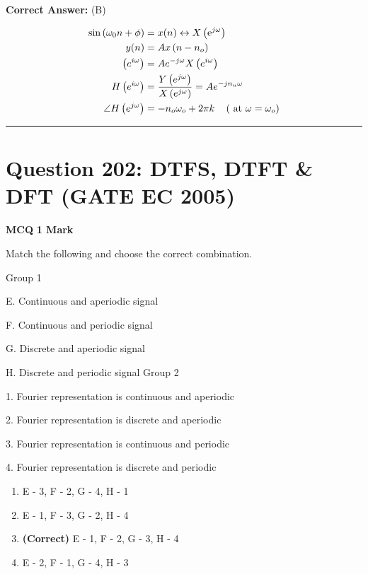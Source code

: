 \documentclass[11pt,a4paper]{article}
\begin{document}
\noindent \textbf{Correct Answer:} (B)

\begin{tcolorbox}[solbox, title=Detailed Solution -- Question 201]
\[
\begin{aligned} \sin \left(\omega_{0} n+\phi\right) &=x(n) \leftrightarrow X\left(\mathrm{e}^{j \omega}\right) \\ y(n) &=A x\left(n-n_{o}\right) \\ \left(e^{i \omega}\right) &=A e^{-j \omega} X\left(e^{i \omega}\right) \\ H\left(e^{i \omega}\right) &=\frac{Y\left(e^{j \omega}\right)}{X\left(e^{j\omega}\right)}=A e^{-j n_{u} \omega}\\ \angle H\left(e^{j \omega}\right)&=-n_{o} \omega_{o}+2 \pi k \quad\left(\text { at } \omega=\omega_{o}\right) \end{aligned}\\
\]
\end{tcolorbox}

\vspace{1.5em}
\hrule
\vspace{1.5em}

\section*{Question 202: DTFS, DTFT \& DFT (GATE EC 2005)}
\noindent \textbf{\color{primary}MCQ} \hfill \textbf{\color{secondary}1 Mark}


\noindent Match the following and choose the correct combination. 

Group 1 

E. Continuous and aperiodic signal 

F. Continuous and periodic signal 

G. Discrete and aperiodic signal 

H. Discrete and periodic signal             
                                                                                                          Group 2 

1. Fourier representation is continuous and aperiodic 

2. Fourier representation is discrete and aperiodic 

3. Fourier representation is continuous and periodic 

4. Fourier representation is discrete and periodic


\begin{enumerate}[label=(\Alph*)]
    \item E - 3, F - 2, G - 4, H - 1
    \item E - 1, F - 3, G - 2, H - 4
    \item \textbf{(Correct)} E - 1, F - 2, G - 3, H - 4
    \item E - 2, F - 1, G - 4, H - 3
\end{enumerate}
\end{document}
